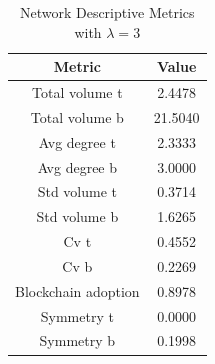 \begin{table}[H]
\centering
\caption{Network Descriptive Metrics with $\lambda = 3$}
\label{tab:network_metrics}
\begin{tabular}{|c|c|}
\toprule
Metric & Value \\
\midrule
Total volume t & 2.4478 \\
Total volume b & 21.5040 \\
Avg degree t & 2.3333 \\
Avg degree b & 3.0000 \\
Std volume t & 0.3714 \\
Std volume b & 1.6265 \\
Cv t & 0.4552 \\
Cv b & 0.2269 \\
Blockchain adoption & 0.8978 \\
Symmetry t & 0.0000 \\
Symmetry b & 0.1998 \\
\bottomrule
\end{tabular}
\end{table}



